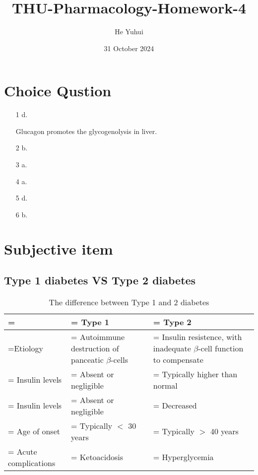 \documentclass{article}
\title{THU-Pharmacology-Homework-4}
\author{He Yuhui\quad 2022012050}
\date{31 October 2024}
\newcommand\columnC{\centering\arraybackslash}
\begin{document}
\maketitle

\section{Choice Qustion}

\begin{itemize}
    \item [1] d.

        Glucagon promotes the glycogenolysis in liver.

    \item [2] b.
    \item [3] a.
    \item [4] a.
    \item [5] d.
    \item [6] b.
\end{itemize}

\section{Subjective item}

\subsection{Type 1 diabetes VS Type 2 diabetes}

\begin{table}[H]
    \centering
    \caption{The difference between Type 1 and 2 diabetes}
    \quad

    \begin{tabularx}{\textwidth}{
        >{\columnC\hsize=0.6\hsize\linewidth=\hsize}X
        >{\columnC\hsize=1.2\hsize\linewidth=\hsize}X
        >{\columnC\hsize=1.2\hsize\linewidth=\hsize}X
    }
        \toprule[1.5pt]
         & Type 1 & Type 2\\
        \midrule
        Etiology & Autoimmune destruction of panceatic $\beta$-cells & Insulin resistence, with inadequate $\beta$-cell function to compensate\\
        \midrule
        Insulin levels & Absent or negligible & Typically higher than normal\\
        \midrule
        Insulin levels & Absent or negligible & Decreased\\
        \midrule
        Age of onset & Typically $<$ 30 years & Typically $>$ 40 years\\
        \midrule
        Acute complications & Ketoacidosis & Hyperglycemia\\
        \bottomrule[1.5pt]
    \end{tabularx}
\end{table}
\end{document}
